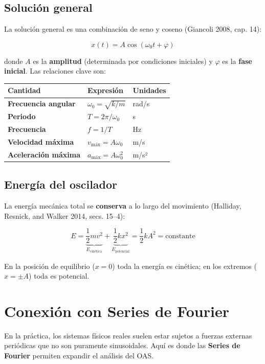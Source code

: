\documentclass[
  letterpaper,
  DIV=11,
  numbers=noendperiod]{scrreprt}
\begin{document}
\subsection{Solución general}\label{soluciuxf3n-general}

La solución general es una combinación de seno y coseno (Giancoli 2008,
cap. 14):

\[
x(t) = A\cos(\omega_0 t + \varphi)
\]

donde \(A\) es la \textbf{amplitud} (determinada por condiciones
iniciales) y \(\varphi\) es la \textbf{fase inicial}. Las relaciones
clave son:

\begin{longtable}[]{@{}lll@{}}
\toprule\noalign{}
Cantidad & Expresión & Unidades \\
\midrule\noalign{}
\endhead
\bottomrule\noalign{}
\endlastfoot
\textbf{Frecuencia angular} & \(\omega_0 = \sqrt{k/m}\) & rad/s \\
\textbf{Periodo} & \(T = 2\pi/\omega_0\) & s \\
\textbf{Frecuencia} & \(f = 1/T\) & Hz \\
\textbf{Velocidad máxima} & \(v_\text{máx} = A\omega_0\) & m/s \\
\textbf{Aceleración máxima} & \(a_\text{máx} = A\omega_0^2\) & m/s² \\
\end{longtable}

\subsection{Energía del oscilador}\label{energuxeda-del-oscilador}

La energía mecánica total se \textbf{conserva} a lo largo del movimiento
(Halliday, Resnick, and Walker 2014, secs. 15--4):

\[
E = \underbrace{\frac{1}{2}mv^2}_{E_\text{cinética}} +
    \underbrace{\frac{1}{2}kx^2}_{E_\text{potencial}} =
    \frac{1}{2}kA^2 = \text{constante}
\]

En la posición de equilibrio (\(x=0\)) toda la energía es cinética; en
los extremos (\(x = \pm A\)) toda es potencial.

\section{Conexión con Series de Fourier}\label{sec-fourier-link}

En la práctica, los sistemas físicos reales suelen estar sujetos a
fuerzas externas periódicas que no son puramente sinusoidales. Aquí es
donde las \textbf{Series de Fourier} permiten expandir el análisis del
OAS.
\end{document}
